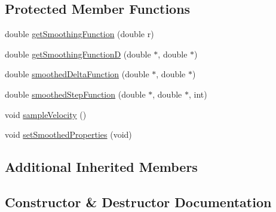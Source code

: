 \subsection*{Protected Member Functions}
\begin{DoxyCompactItemize}
\item 
double \hyperlink{class_incompress___solver___smooth__2_d___basis_ad926758f275483afff084731641cbd61}{get\+Smoothing\+Function} (double r)
\item 
double \hyperlink{class_incompress___solver___smooth__2_d___basis_a76faea455345efe10045ddfb86e3dd05}{get\+Smoothing\+FunctionD} (double $\ast$, double $\ast$)
\item 
double \hyperlink{class_incompress___solver___smooth__2_d___basis_a8196f81d8c7264f93ce053b8163735f0}{smoothed\+Delta\+Function} (double $\ast$, double $\ast$)
\item 
double \hyperlink{class_incompress___solver___smooth__2_d___basis_aabbbc6d225ca87dfe8a7a7a840e7a346}{smoothed\+Step\+Function} (double $\ast$, double $\ast$, int)
\item 
void \hyperlink{class_incompress___solver___smooth__2_d___basis_a6c2e1fb16f0985e6f4a08b969af66a06}{sample\+Velocity} ()
\item 
void \hyperlink{class_incompress___solver___smooth__2_d___basis_a590431080127f6a0fe17238766ec673d}{set\+Smoothed\+Properties} (void)
\end{DoxyCompactItemize}
\subsection*{Additional Inherited Members}


\subsection{Constructor \& Destructor Documentation}
